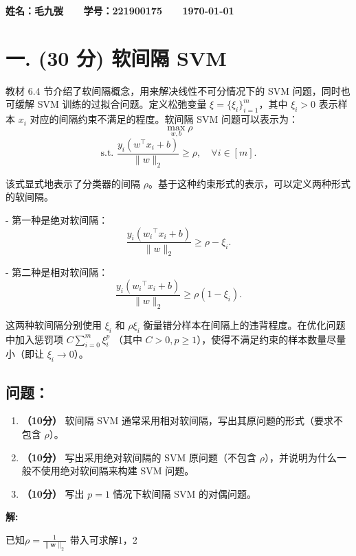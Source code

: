 \documentclass[8pt]{article}
\begin{document}
\textbf{
\color{blue}
\Large 姓名：毛九弢 \ \ \ 学号：221900175 \ \ \ \today}

\section*{一. (30 分) 软间隔 SVM}
教材 6.4 节介绍了软间隔概念，用来解决线性不可分情况下的 SVM 问题，同时也可缓解 SVM 训练的过拟合问题。定义松弛变量 \( \xi = \{\xi_i\}_{i=1}^m \)，其中 \( \xi_i > 0 \) 表示样本 \( x_i \) 对应的间隔约束不满足的程度。软间隔 SVM 问题可以表示为：
\[
\max_{w, b} \rho
\]
\[
\text{s.t. } \frac{y_i (w^\top x_i + b)}{\|w\|_2} \geq \rho, \quad \forall i \in [m].
\]


该式显式地表示了分类器的间隔 \( \rho \)。基于这种约束形式的表示，可以定义两种形式的软间隔。

- 第一种是绝对软间隔：
  \[
  \frac{y_i ({w_i}^\top x_i + b)}{\|w\|_2} \geq \rho - \xi_i.
  \]

- 第二种是相对软间隔：
  \[
  \frac{y_i ({w_i}^\top x_i + b)}{\|w\|_2} \geq \rho(1 - \xi_i).
  \]

这两种软间隔分别使用 \( \xi_i \) 和 \( \rho \xi_i \) 衡量错分样本在间隔上的违背程度。在优化问题中加入惩罚项 \( C \sum_{i=0}^m \xi_i^p \) （其中 \( C > 0, p \geq 1 \)），使得不满足约束的样本数量尽量小（即让 \( \xi_i \to 0 \)）。

\subsection*{问题：}

\begin{enumerate}
    \item \textbf{（10分）} 软间隔 SVM 通常采用相对软间隔，写出其原问题的形式（要求不包含 \( \rho \)）。
    \item \textbf{（10分）} 写出采用绝对软间隔的 SVM 原问题（不包含 \( \rho \)），并说明为什么一般不使用绝对软间隔来构建 SVM 问题。
    \item \textbf{（10分）} 写出 \( p = 1 \) 情况下软间隔 SVM 的对偶问题。
\end{enumerate}


\textbf{\large 解:}


{\color{red} 已知\(\rho = \frac{1}{\|\mathbf{w}\|_2}\) 带入可求解1，2}
\end{document}
